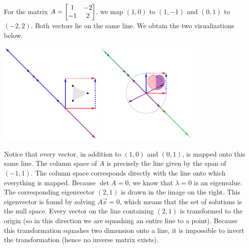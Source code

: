 \begin{example}
For the matrix 
$A=\begin{bmatrix} 1&-2\\-1&2 \end{bmatrix}$, we map $(1,0)$ to $(1,-1)$ and $(0,1)$ to $(-2,2)$. Both vectors lie on the same line.
We obtain the two visualizations below. 
\begin{center}
\includegraphics[height=2in]{04-Linear-Transformations/support/LTsingular2da}
\includegraphics[height=2in]{04-Linear-Transformations/support/LTsingular2db}
\end{center}
Notice that every vector, in addition to $(1,0)$ and $(0,1)$, is mapped onto this same line.  The column space of $A$ is precisely the line given by the span of $(-1,1)$. The column space corresponds directly with the line onto which everything is mapped. Because $\det A = 0$, we know that $\lambda=0$ is an eigenvalue. The corresponding eigenvector $(2,1)$ is drawn in the image on the right. This eigenvector is found by solving $A\vec x = 0$, which means that the set of solutions is the null space.  Every vector on the line containing $(2,1)$ is transformed to the origin (so in this direction we are squashing an entire line to a point).  Because this transformation squashes two dimension onto a line, it is impossible to invert the transformation (hence no inverse matrix exists).

\end{example}
